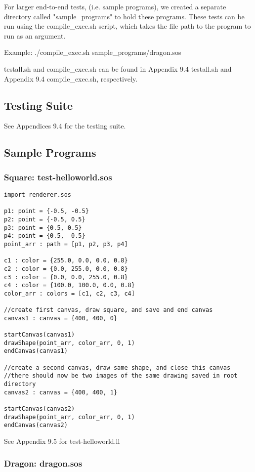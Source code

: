 \documentclass[main.tex]{subfiles}
\begin{document}
	For larger end-to-end tests, (i.e. sample programs), we created a separate directory called "sample\_programs" to hold these programs. These tests can be run using the compile\_exec.sh script, which takes the file path to the program to run as an argument.
	
	Example: ./compile\_exec.sh sample\_programs/dragon.sos
	
	testall.sh and compile\_exec.sh can be found in Appendix 9.4 testall.sh and Appendix 9.4 compile\_exec.sh, respectively. 
	
    \subsection{Testing Suite}
    
    See Appendices 9.4 for the testing suite.
    
	\subsection{Sample Programs}

	\subsubsection{Square: test-helloworld.sos}
	\begin{lstlisting}
import renderer.sos

p1: point = {-0.5, -0.5}
p2: point = {-0.5, 0.5}
p3: point = {0.5, 0.5}
p4: point = {0.5, -0.5}
point_arr : path = [p1, p2, p3, p4] 

c1 : color = {255.0, 0.0, 0.0, 0.8}
c2 : color = {0.0, 255.0, 0.0, 0.8}
c3 : color = {0.0, 0.0, 255.0, 0.8}
c4 : color = {100.0, 100.0, 0.0, 0.8}
color_arr : colors = [c1, c2, c3, c4] 

//create first canvas, draw square, and save and end canvas
canvas1 : canvas = {400, 400, 0}

startCanvas(canvas1)
drawShape(point_arr, color_arr, 0, 1)
endCanvas(canvas1)

//create a second canvas, draw same shape, and close this canvas
//there should now be two images of the same drawing saved in root directory
canvas2 : canvas = {400, 400, 1}

startCanvas(canvas2)
drawShape(point_arr, color_arr, 0, 1)
endCanvas(canvas2)
\end{lstlisting}

See Appendix 9.5 for test-helloworld.ll

\subsubsection{Dragon: dragon.sos}
\end{document}
